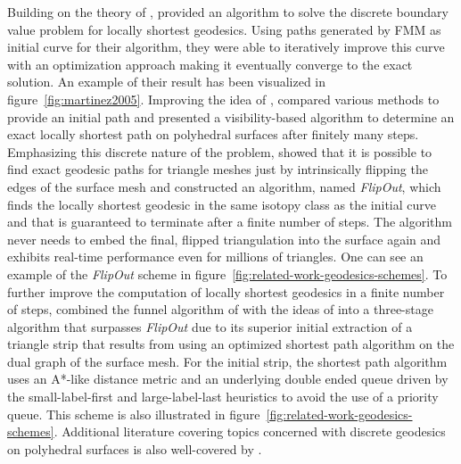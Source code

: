 \documentclass{stdlocal}
\begin{document}
Building on the theory of \textcite{polthier2006}, \textcite{martinez2005} provided an algorithm to solve the discrete boundary value problem for locally shortest geodesics.
Using paths generated by FMM as initial curve for their algorithm, they were able to iteratively improve this curve with an optimization approach making it eventually converge to the exact solution.
An example of their result has been visualized in figure~\ref{fig:martinez2005}.
Improving the idea of \textcite{martinez2005}, \textcite{xin2007} compared various methods to provide an initial path and presented a visibility-based algorithm to determine an exact locally shortest path on polyhedral surfaces after finitely many steps.
Emphasizing this discrete nature of the problem, \textcite{sharp2020} showed that it is possible to find exact geodesic paths for triangle meshes just by intrinsically flipping the edges of the surface mesh and constructed an algorithm, named \textit{FlipOut}, which finds the locally shortest geodesic in the same isotopy class as the initial curve and that is guaranteed to terminate after a finite number of steps.
The algorithm never needs to embed the final, flipped triangulation into the surface again and exhibits real-time performance even for millions of triangles.
One can see an example of the \textit{FlipOut} scheme in figure~\ref{fig:related-work-geodesics-schemes}.
To further improve the computation of locally shortest geodesics in a finite number of steps, \textcite{mancinelli2022} combined the funnel algorithm of \textcite{lee1984} with the ideas of \textcite{xin2007} into a three-stage algorithm that surpasses \textit{FlipOut} due to its superior initial extraction of a triangle strip that results from using an optimized shortest path algorithm on the dual graph of the surface mesh.
For the initial strip, the shortest path algorithm uses an A*-like distance metric and an underlying double ended queue driven by the small-label-first and large-label-last heuristics to avoid the use of a priority queue.
This scheme is also illustrated in figure~\ref{fig:related-work-geodesics-schemes}.
Additional literature covering topics concerned with discrete geodesics on polyhedral surfaces is also well-covered by \textcite{crane2020}.
\end{document}
